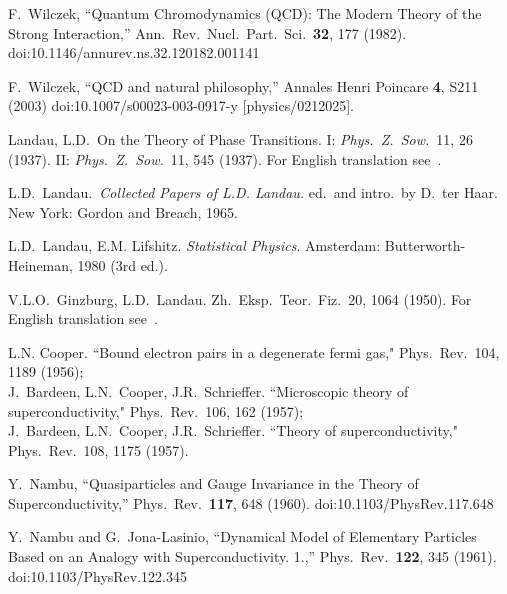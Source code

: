 \documentclass[letter,12pt]{article}
\begin{document}
\begin{thebibliography}{99}
  
  F.~Wilczek,
  ``Quantum Chromodynamics ({QCD}): The Modern Theory of the Strong Interaction,''
  Ann.\ Rev.\ Nucl.\ Part.\ Sci.\  {\bf 32}, 177 (1982).
  doi:10.1146/annurev.ns.32.120182.001141

  F.~Wilczek,
  ``QCD and natural philosophy,''
  Annales Henri Poincare {\bf 4}, S211 (2003)
  doi:10.1007/s00023-003-0917-y
  [physics/0212025].
  
  Landau, L.D.\ On the Theory of Phase Transitions. I: {\it Phys.\ Z.\ Sow.}\ 11, 26 (1937). II: {\it Phys.\ Z.\ Sow.}\ 11, 545 (1937). For English translation see~\cite{Landau:1965}. 
  
  L.D.~Landau.\ {\it Collected Papers of L.D. Landau.} ed.\ and intro.\ by D.\ ter Haar. New York: Gordon and Breach, 1965.
  
  L.D.~Landau, E.M. Lifshitz. {\it Statistical Physics}. Amsterdam: Butterworth-Heineman, 1980 (3rd ed.).
  
  V.L.O.~Ginzburg, L.D.~Landau. Zh.\ Eksp.\ Teor.\ Fiz.\ 20, 1064 (1950). For English translation see~\cite{Landau:1965}. %
 
L.N. Cooper. ``Bound electron pairs in a degenerate fermi gas," Phys.\ Rev.\ 104, 1189 (1956); \\
J.~Bardeen, L.N.~Cooper, J.R.~Schrieffer. ``Microscopic theory of superconductivity," Phys.\ Rev.\ 106, 162 (1957); \\
J.~Bardeen, L.N.~Cooper, J.R.~Schrieffer. ``Theory of superconductivity," Phys.\ Rev.\ 108, 1175 (1957).

  Y.~Nambu,
  ``Quasiparticles and Gauge Invariance in the Theory of Superconductivity,''
  Phys.\ Rev.\  {\bf 117}, 648 (1960).
  doi:10.1103/PhysRev.117.648
  
  Y.~Nambu and G.~Jona-Lasinio,
  ``Dynamical Model of Elementary Particles Based on an Analogy with Superconductivity. 1.,''
  Phys.\ Rev.\  {\bf 122}, 345 (1961).
  doi:10.1103/PhysRev.122.345


\end{thebibliography}
\end{document}
